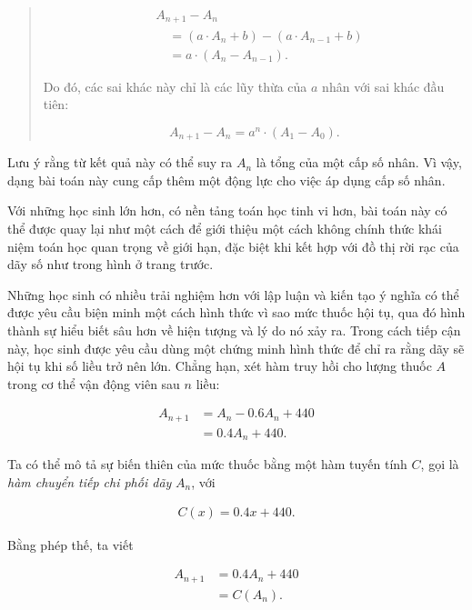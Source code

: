 \documentclass[
  10pt,
  a4paper,
  landscape,
  twoside,
  openany
]{scrbook}
\begin{document}
{\begin{description}
\begin{quotation}
    \begin{align*}
      &A_{n+1}-A_n \\
      &\quad =(a\cdot A_n+b)-(a\cdot A_{n-1}+b) \\
      &\quad =a\cdot (A_n-A_{n-1}).
    \end{align*}

    Do đó, các sai khác này chỉ là các lũy thừa của $a$ nhân với sai khác đầu tiên:
    
    $$
    A_{n+1}-A_n
      =a^n\cdot (A_1-A_0).
    $$
  \end{quotation}

  Lưu ý rằng từ kết quả này có thể suy ra $A_n$ là tổng của một cấp số nhân. Vì vậy, dạng bài toán này cung cấp thêm một động lực cho việc áp dụng cấp số nhân.
  \item[Phương pháp 4.] Với những học sinh lớn hơn, có nền tảng toán học tinh vi hơn, bài toán này có thể được quay lại như một cách để giới thiệu một cách không chính thức khái niệm toán học quan trọng về giới hạn, đặc biệt khi kết hợp với đồ thị rời rạc của dãy số như trong hình ở trang trước.
  \item[Phương pháp 5.] Những học sinh có nhiều trải nghiệm hơn với lập luận và kiến tạo ý nghĩa có thể được yêu cầu biện minh một cách hình thức vì sao mức thuốc hội tụ, qua đó hình thành sự hiểu biết sâu hơn về hiện tượng và lý do nó xảy ra. Trong cách tiếp cận này, học sinh được yêu cầu dùng một chứng minh hình thức để chỉ ra rằng dãy sẽ hội tụ khi số liều trở nên lớn. Chẳng hạn, xét hàm truy hồi cho lượng thuốc $A$ trong cơ thể vận động viên sau $n$ liều:

  \begin{align*}
    A_{n+1}
      &=A_n-0.6A_n+440 \\
      &=0.4A_n+440. \tag{1}
  \end{align*} 

  Ta có thể mô tả sự biến thiên của mức thuốc bằng một hàm tuyến tính $C$, gọi là \emph{hàm chuyển tiếp chi phối dãy} $A_n$, với

    \begin{align*}
      C(x)=0.4x+440. \tag{2}
    \end{align*} 

  Bằng phép thế, ta viết

  \begin{align*}
    A_{n+1}
      &=0.4A_n+440 \\
      &=C(A_n). \tag{3}
  \end{align*} 



\end{description}}
\end{document}
